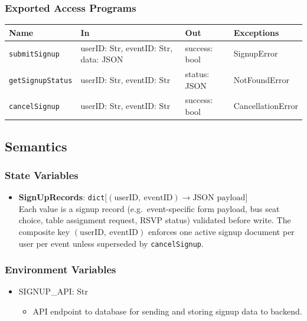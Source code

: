 \documentclass[12pt, titlepage]{article}
\begin{document}
\subsubsection{Exported Access Programs}
\begin{center}
\begin{tabular}{p{4cm} p{4cm} p{4cm} p{4cm}}
\hline
\textbf{Name} & \textbf{In} & \textbf{Out} & \textbf{Exceptions} \\
\hline
\texttt{submitSignup} & userID: Str, eventID: Str, data: JSON & success: bool & SignupError \\
\texttt{getSignupStatus} & userID: Str, eventID: Str & status: JSON & NotFoundError \\
\texttt{cancelSignup} & userID: Str, eventID: Str & success: bool & CancellationError \\
\hline
\end{tabular}
\end{center}

\subsection{Semantics}

\subsubsection{State Variables}

\begin{itemize}
    \item \textbf{SignUpRecords}: \texttt{dict}$\bigl[(\text{userID},\ \text{eventID}) \rightarrow \text{JSON payload}\bigr]$\\
    Each value is a signup record (e.g.\ event-specific form payload, bus seat choice, table assignment request, RSVP status) validated before write. The composite key $(\text{userID},\ \text{eventID})$ enforces one active signup document per user per event unless superseded by \texttt{cancelSignup}.
\end{itemize}

\subsubsection{Environment Variables}
\begin{itemize}
    \item SIGNUP\_API: Str
    \begin{itemize}
        \item API endpoint to database for sending and storing signup data to backend.
    \end{itemize}
\end{itemize}
\end{document}
